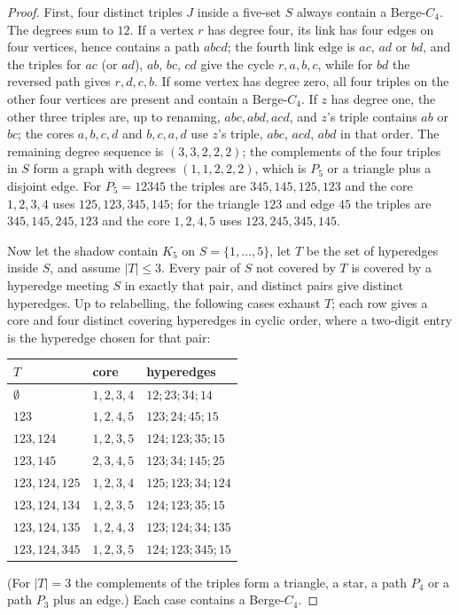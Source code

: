 \documentclass[11pt]{article}
\theoremstyle{remark}
\begin{document}
\begin{proof}
First, four distinct triples $J$ inside a five-set $S$ always contain a
Berge-$C_4$. The degrees sum to $12$. If a vertex $r$ has degree four, its
link has four edges on four vertices, hence contains a path $abcd$; the
fourth link edge is $ac$, $ad$ or $bd$, and the triples for $ac$ (or $ad$),
$ab$, $bc$, $cd$ give the cycle $r,a,b,c$, while for $bd$ the reversed path
gives $r,d,c,b$. If some vertex has degree zero, all four triples on the
other four vertices are present and contain a Berge-$C_4$. If $z$ has
degree one, the other three triples are, up to renaming, $abc,abd,acd$, and
$z$'s triple contains $ab$ or $bc$; the cores $a,b,c,d$ and $b,c,a,d$ use
$z$'s triple, $abc$, $acd$, $abd$ in that order. The remaining degree
sequence is $(3,3,2,2,2)$; the complements of the four triples in $S$ form
a graph with degrees $(1,1,2,2,2)$, which is $P_5$ or a triangle plus a
disjoint edge. For $P_5=12345$ the triples are $345,145,125,123$ and the
core $1,2,3,4$ uses $125,123,345,145$; for the triangle $123$ and edge
$45$ the triples are $345,145,245,123$ and the core $1,2,4,5$ uses
$123,245,345,145$.

Now let the shadow contain $K_5$ on $S=\{1,\dots,5\}$, let $T$ be the set
of hyperedges inside $S$, and assume $|T|\le3$. Every pair of $S$ not
covered by $T$ is covered by a hyperedge meeting $S$ in exactly that pair,
and distinct pairs give distinct hyperedges. Up to relabelling, the
following cases exhaust $T$; each row gives a core and four distinct
covering hyperedges in cyclic order, where a two-digit entry is the
hyperedge chosen for that pair:
\begin{center}\small
\begin{tabular}{lll}
\toprule
$T$ & core & hyperedges\\
\midrule
$\emptyset$ & $1,2,3,4$ & $12;23;34;14$\\
$123$ & $1,2,4,5$ & $123;24;45;15$\\
$123,124$ & $1,2,3,5$ & $124;123;35;15$\\
$123,145$ & $2,3,4,5$ & $123;34;145;25$\\
$123,124,125$ & $1,2,3,4$ & $125;123;34;124$\\
$123,124,134$ & $1,2,3,5$ & $124;123;35;15$\\
$123,124,135$ & $1,2,4,3$ & $123;124;34;135$\\
$123,124,345$ & $1,2,3,5$ & $124;123;345;15$\\
\bottomrule
\end{tabular}
\end{center}
(For $|T|=3$ the complements of the triples form a triangle, a star, a
path $P_4$ or a path $P_3$ plus an edge.) Each case contains a Berge-$C_4$.
\end{proof}
\end{document}
